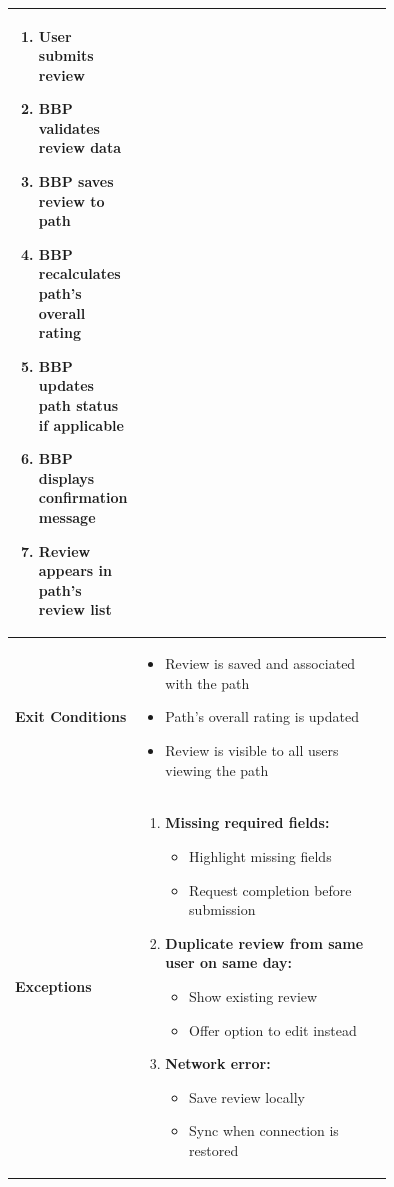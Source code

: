 \begin{center}
\begin{longtable}{|l|p{0.75\linewidth}|}
\begin{enumerate}
\begin{itemize}
            \end{itemize}
            \item User submits review
            \item BBP validates review data
            \item BBP saves review to path
            \item BBP recalculates path's overall rating
            \item BBP updates path status if applicable
            \item BBP displays confirmation message
            \item Review appears in path's review list
        \end{enumerate} \\
        \hline
        \textbf{Exit Conditions}   & 
        \begin{itemize}
            \item Review is saved and associated with the path
            \item Path's overall rating is updated
            \item Review is visible to all users viewing the path
        \end{itemize} \\
        \hline
        \textbf{Exceptions}       & 
        \begin{enumerate}
            \item \textbf{Missing required fields:}
            \begin{itemize}
                \item Highlight missing fields
                \item Request completion before submission
            \end{itemize}
            \item \textbf{Duplicate review from same user on same day:}
            \begin{itemize}
                \item Show existing review
                \item Offer option to edit instead
            \end{itemize}
            \item \textbf{Network error:}
            \begin{itemize}
                \item Save review locally
                \item Sync when connection is restored
            \end{itemize}

\end{enumerate}
\end{longtable}
\end{center}
